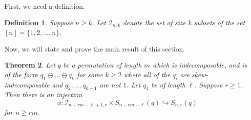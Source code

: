 \documentclass[11pt, final]{amsart}
\newtheorem{theorem}{Theorem}[section]								\newtheorem{proposition}[theorem]{Proposition}
\newtheorem{definition}[theorem]{Definition}
\theoremstyle{remark}
\numberwithin{equation}{section}
\begin{document}
    

    


First, we need a definition.
\begin{definition}
    Suppose $n\geq k$. Let $\mathcal{I}_{n,k}$ denote the set of size $k$ subsets of the set $[n] = \{1,2, ..., n \}$.
\end{definition}
Now, we will state and prove the main result of this section.
\begin{theorem}
    Let $q$ be a permutation of length $m$ which is indecomposable, and is of the form $q_1 \ominus ... \ominus q_k$ for some $k \geq 2$ where all of the $q_i$ are skew-indecomposable and $q_2, ..., q_{k-1}$ are not $1$. Let $q_1$ be of length $\ell$.  Suppose $r \geq 1$. Then there is an injection
    \[
    \phi: \mathcal{I}_{n-rm-\ell+1, r} \times S_{n - rm - \ell}(q) \hookrightarrow S_{n,r}(q)
    \]
    for $n\geq rm$.

\end{theorem}
\end{document}
